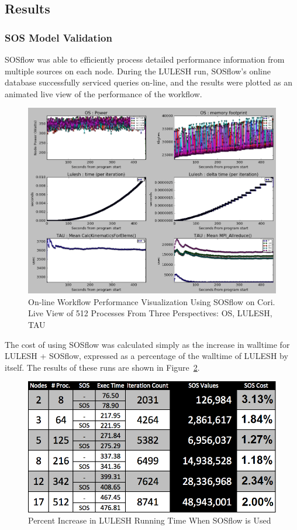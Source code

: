 \subsection{Results} %
%
%
\subsubsection{SOS Model Validation} %
%
SOSflow was able to efficiently process detailed performance
information from multiple sources on each node.
%
During the LULESH run, SOSflow's online database successfully serviced
queries on-line, and the results were plotted as an animated live
view of the performance of the workflow.
%
\begin{figure}[h]
\centering
\includegraphics[width=\columnwidth]{images/512_procs.png}
\caption{On-line Workflow Performance Visualization Using SOSflow on
  Cori.  Live View of 512 Processes From Three Perspectives: OS,
  LULESH, TAU}
\label{cori_visualization}
\end{figure}
%
The cost of using SOSflow was calculated simply as the increase in
walltime for LULESH + SOSflow, expressed as a percentage of the walltime
of LULESH by itself.
%
The results of these runs are shown in Figure~\ref{cori_results}.
%
\begin{figure}[h]
\centering
\includegraphics[width=\columnwidth]{images/cori_results.png}
\caption{Percent Increase in LULESH Running Time When SOSflow is Used}
\label{cori_results}
\end{figure}
%
%
